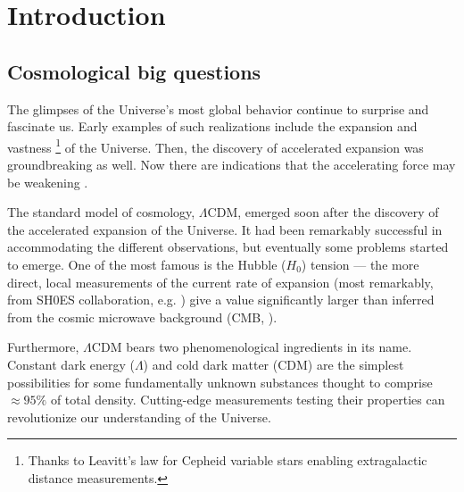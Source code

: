 \chapter{Introduction}
\label{ch:intro}

\section{Cosmological big questions}

The glimpses of the Universe's most global behavior continue to surprise and fascinate us.
Early examples of such realizations include the expansion \citep{Slipher-extragalactic-radial-velocities,Hubbles-law} and vastness \citep{Hubble-extragalactic-distances}\footnote{Thanks to Leavitt's law \citep{Leavitt-law} for Cepheid variable stars enabling extragalactic distance measurements.} of the Universe.
Then, the discovery of accelerated expansion \citep{accelerated-expansion-perlmutter-et-al,accelerated-expansion-riess-et-al} was groundbreaking as well.
Now there are indications that the accelerating force may be weakening \citep{PantheonPlus-cosmo,Union3,DES-Y5-SN-cosmo,DESI2024.VI.KP7A,DESI.DR2.BAO.cosmo}.

The standard model of cosmology, $\Lambda$CDM, emerged soon after the discovery of the accelerated expansion of the Universe.
It had been remarkably successful in accommodating the different observations, but eventually some problems started to emerge.
One of the most famous is the Hubble ($H_0$) tension --- the more direct, local measurements of the current rate of expansion (most remarkably, from SH0ES collaboration, e.g. \cite{SH0ES}) give a value significantly larger than inferred from the cosmic microwave background (CMB, \cite{Planck2018-cosmo}).

Furthermore, $\Lambda$CDM bears two phenomenological ingredients in its name.
Constant dark energy ($\Lambda$) and cold dark matter (CDM) are the simplest possibilities for some fundamentally unknown substances thought to comprise $\approx 95\%$ of total density.
Cutting-edge measurements testing their properties can revolutionize our understanding of the Universe.

